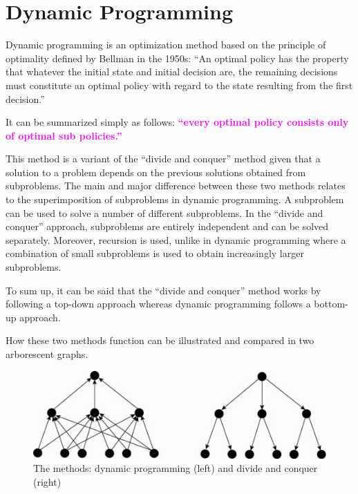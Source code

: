 \section{Dynamic Programming}


Dynamic programming is an optimization method based on the principle of optimality 
defined by Bellman in the 1950s: “An optimal policy has the property that whatever 
the initial state and initial decision are, the remaining decisions must constitute 
an optimal policy with regard to the state resulting from the first decision.”

It can be summarized simply as follows: {\bf \textcolor{magenta}{“every optimal policy consists only of 
optimal sub policies.”}}

This method is a variant of the “divide and conquer” method given that a solution 
to a problem depends on the previous solutions obtained from subproblems. The main 
and major difference between these two methods relates to the superimposition of 
subproblems in dynamic programming. A subproblem can be used to solve a number of 
different subproblems. In the “divide and conquer” approach, subproblems are 
entirely independent and can be solved separately. Moreover, recursion is used, 
unlike in dynamic programming where a combination of small subproblems is used to 
obtain increasingly larger subproblems.

To sum up, it can be said that the “divide and conquer” method works by following 
a top-down approach whereas dynamic programming follows a bottom-up approach.

How these two methods function can be illustrated and compared in two arborescent graphs.

\begin{figure}[!htb]
\centering
\includegraphics[scale=0.8]{pix/dnc_dp.jpg}
\caption{The methods: dynamic programming (left) and divide and conquer (right)}
\end{figure}




